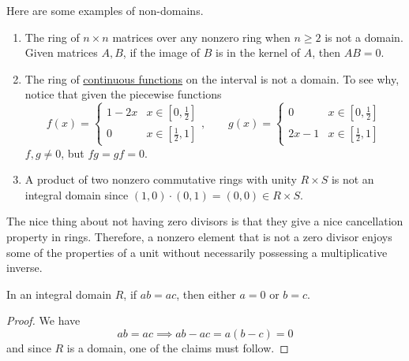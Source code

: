   \begin{example}
    \label{ex:non-domains}
    Here are some examples of non-domains. 
    \begin{enumerate}
      \item The ring of $n \times n$ matrices over any nonzero ring when $ n \geq 2$ is not a domain. Given matrices $A, B$, if the image of $B$ is in the kernel of $A$, then $A B = 0$.
      \item The ring of \hyperref[pst-def:continuous_func]{continuous functions} on the interval is not a domain. To see why, notice that given the piecewise functions 
      \begin{equation}
        f (x) = \begin{cases}
          1 - 2x & x \in [0, \frac{1}{2}] \\
          0 & x \in [\frac{1}{2}, 1] 
        \end{cases}, \qquad 
        g (x) = \begin{cases}
          0 & x \in [0, \frac{1}{2}] \\
          2x - 1 & x \in [\frac{1}{2}, 1] 
        \end{cases}
      \end{equation}
      $f, g \neq 0$, but $f g = g f = 0$. 

      \item A product of two nonzero commutative rings with unity $R \times S$ is not an integral domain since $(1,0) \cdot (0, 1) = (0, 0) \in R \times S$. 
    \end{enumerate}
  \end{example}

  The nice thing about not having zero divisors is that they give a nice cancellation property in rings. Therefore, a nonzero element that is not a zero divisor enjoys some of the properties of a unit without necessarily possessing a multiplicative inverse. 

  \begin{lemma}
    \label{thm:cancellation-property-of-elements}
    In an integral domain $R$, if $ab = ac$, then either $a = 0$ or $b = c$. 
  \end{lemma}
  \begin{proof}
    We have 
    \begin{equation}
      ab = ac \implies ab - ac = a(b - c) = 0
    \end{equation}
    and since $R$ is a domain, one of the claims must follow. 
  \end{proof}


